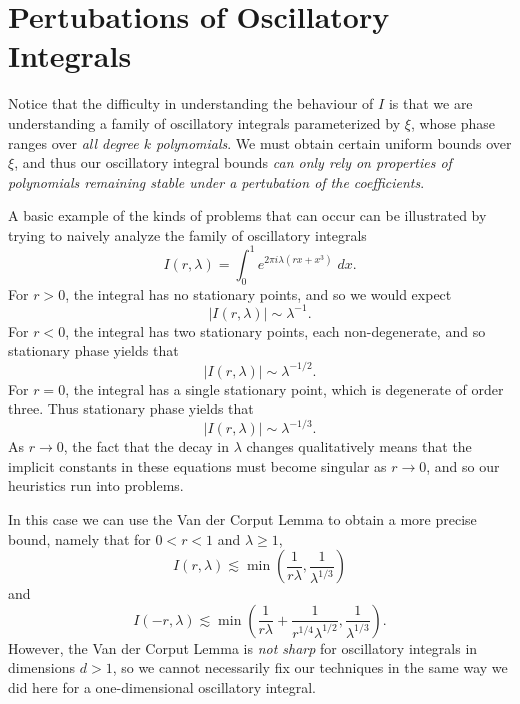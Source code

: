 \section{Pertubations of Oscillatory Integrals}

Notice that the difficulty in understanding the behaviour of $I$ is that we are understanding a family of oscillatory integrals parameterized by $\xi$, whose phase ranges over \emph{all degree $k$ polynomials}. We must obtain certain uniform bounds over $\xi$, and thus our oscillatory integral bounds \emph{can only rely on properties of polynomials remaining stable under a pertubation of the coefficients}.

A basic example of the kinds of problems that can occur can be illustrated by trying to naively analyze the family of oscillatory integrals
%
\[ I(r,\lambda) = \int_0^1 e^{2\pi i \lambda (rx + x^3)}\; dx. \]
%
For $r > 0$, the integral has no stationary points, and so we would expect
%
\[ |I(r,\lambda)| \sim \lambda^{-1}. \]
%
For $r < 0$, the integral has two stationary points, each non-degenerate, and so stationary phase yields that
%
\[ |I(r,\lambda)| \sim \lambda^{-1/2}. \]
%
For $r = 0$, the integral has a single stationary point, which is degenerate of order three. Thus stationary phase yields that
%
\[ |I(r,\lambda)| \sim \lambda^{-1/3}. \]
%
As $r \to 0$, the fact that the decay in $\lambda$ changes qualitatively means that the implicit constants in these equations must become singular as $r \to 0$, and so our heuristics run into problems.

In this case we can use the Van der Corput Lemma to obtain a more precise bound, namely that for $0 < r < 1$ and $\lambda \geq 1$,
%
\[ I(r,\lambda) \lesssim \min \left( \frac{1}{r\lambda}, \frac{1}{\lambda^{1/3}} \right) \]
%
and
%
\[ I(-r,\lambda) \lesssim \min \left( \frac{1}{r\lambda} + \frac{1}{r^{1/4} \lambda^{1/2}}, \frac{1}{\lambda^{1/3}} \right). \]
%
However, the Van der Corput Lemma is \emph{not sharp} for oscillatory integrals in dimensions $d > 1$, so we cannot necessarily fix our techniques in the same way we did here for a one-dimensional oscillatory integral.
%
%

